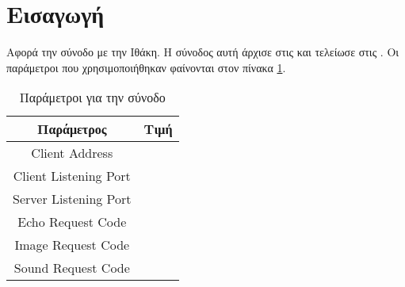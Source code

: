 \section{Εισαγωγή}
Αφορά την \sessionnumber{} σύνοδο με την Ιθάκη.
Η σύνοδος αυτή άρχισε στις \sessiondatestart{} και τελείωσε στις \sessiondateend{}.
Οι παράμετροι που χρησιμοποιήθηκαν φαίνονται στον πίνακα
\hyperref[table:codes]{\ref{table:codes}}.

\begin{table}
\centering
\begin{tabular}{c|c}
\hline
\multicolumn{1}{c}{\bfseries Παράμετρος} & \multicolumn{1}{|c}{\bfseries Τιμή}\\\hline
Client Address&\clientaddress{}\\
Client Listening Port&\clientlisteningport{}\\
Server Listening Port&\serverlisteningport{}\\
Echo Request Code&\echorequestcode{}\\
Image Request Code&\imagerequestcode{}\\
Sound Request Code&\soundrequestcode{}\\
\end{tabular}
\caption{Παράμετροι για την \sessionnumber{} σύνοδο}
\label{table:codes}
\end{table}
\FloatBarrier
